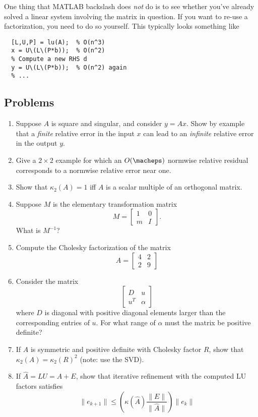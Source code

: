 \documentclass[12pt, leqno]{article}
\begin{document}
One thing that MATLAB backslash does {\em not} do is to see whether
you've already solved a linear system involving the matrix in
question.  If you want to re-use a factorization, you need to do so
yourself.  This typically looks something like
\begin{lstlisting}
  [L,U,P] = lu(A);  % O(n^3)
  x = U\(L\(P*b));  % O(n^2)
  % Compute a new RHS d
  y = U\(L\(P*b));  % O(n^2) again
  % ...
\end{lstlisting}

\subsection{Problems}

\begin{enumerate}
\item
  Suppose $A$ is square and singular, and consider $y = Ax$.
  Show by example that a {\em finite} relative error in the input
  $x$ can lead to an {\em infinite} relative error in the output $y$.
\item
  Give a $2 \times 2$ example for which an $O(\macheps)$ normwise
  relative residual corresponds to a normwise relative error near one.
\item
  Show that $\kappa_2(A) = 1$ iff $A$ is a scalar multiple of an
  orthogonal matrix.
\item
  Suppose $M$ is the elementary transformation matrix
  \[
    M = \begin{bmatrix} 1 & 0 \\ m & I \end{bmatrix}.
  \]
  What is $M^{-1}$?
\item
  Compute the Cholesky factorization of the matrix
  \[
  A = \begin{bmatrix}
         4 & 2 \\
         2 & 9
      \end{bmatrix}
  \]
\item
  Consider the matrix
  \[
  \begin{bmatrix}
    D & u \\
    u^T & \alpha
  \end{bmatrix}
  \]
  where $D$ is diagonal with positive diagonal elements larger than the
  corresponding entries of $u$.  For what range of $\alpha$ must
  the matrix be positive definite?
\item
  If $A$ is symmetric and positive definite with Cholesky factor $R$,
  show that $\kappa_2(A) = \kappa_2(R)^2$ (note: use the SVD).
\item
  If $\hat{A} = LU = A+E$, show that iterative refinement with
  the computed LU factors satisfies
  \[
    \|e_{k+1}\| \leq
    \left( \kappa(\hat{A}) \frac{\|E\|}{\|\hat{A}\|} \right) \|e_k\|
  \]
\end{enumerate}
\end{document}
